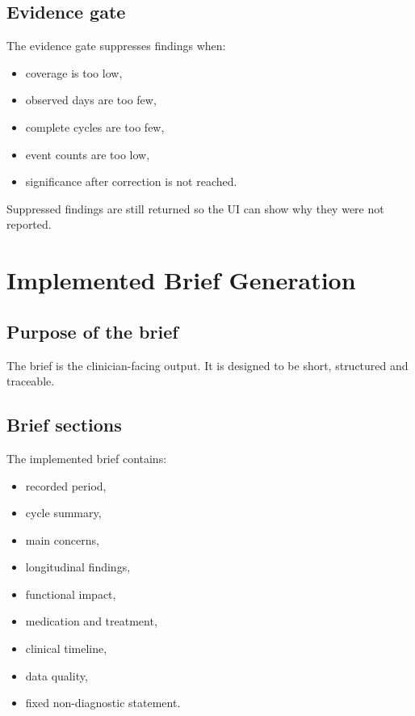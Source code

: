 \documentclass[11pt,a4paper]{article}
\begin{document}
\subsection{Evidence gate}

The evidence gate suppresses findings when:

\begin{itemize}
  \item coverage is too low,
  \item observed days are too few,
  \item complete cycles are too few,
  \item event counts are too low,
  \item significance after correction is not reached.
\end{itemize}

Suppressed findings are still returned so the UI can show why they were not reported.

\section{Implemented Brief Generation}

\subsection{Purpose of the brief}

The brief is the clinician-facing output. It is designed to be short, structured and traceable.

\subsection{Brief sections}

The implemented brief contains:

\begin{itemize}
  \item recorded period,
  \item cycle summary,
  \item main concerns,
  \item longitudinal findings,
  \item functional impact,
  \item medication and treatment,
  \item clinical timeline,
  \item data quality,
  \item fixed non-diagnostic statement.
\end{itemize}
\end{document}
